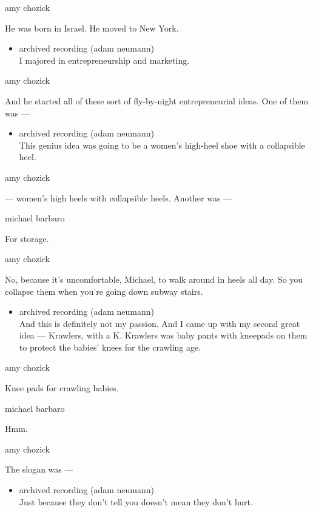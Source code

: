 amy chozick

He was born in Israel. He moved to New York.

\begin{itemize}
\tightlist
\item
  archived recording (adam neumann)\\
  I majored in entrepreneurship and marketing.
\end{itemize}

amy chozick

And he started all of these sort of fly-by-night entrepreneurial ideas.
One of them was ---

\begin{itemize}
\tightlist
\item
  archived recording (adam neumann)\\
  This genius idea was going to be a women's high-heel shoe with a
  collapsible heel.
\end{itemize}

amy chozick

--- women's high heels with collapsible heels. Another was ---

michael barbaro

For storage.

amy chozick

No, because it's uncomfortable, Michael, to walk around in heels all
day. So you collapse them when you're going down subway stairs.

\begin{itemize}
\tightlist
\item
  archived recording (adam neumann)\\
  And this is definitely not my passion. And I came up with my second
  great idea --- Krawlers, with a K. Krawlers was baby pants with
  kneepads on them to protect the babies' knees for the crawling age.
\end{itemize}

amy chozick

Knee pads for crawling babies.

michael barbaro

Hmm.

amy chozick

The slogan was ---

\begin{itemize}
\tightlist
\item
  archived recording (adam neumann)\\
  Just because they don't tell you doesn't mean they don't hurt.
\end{itemize}

